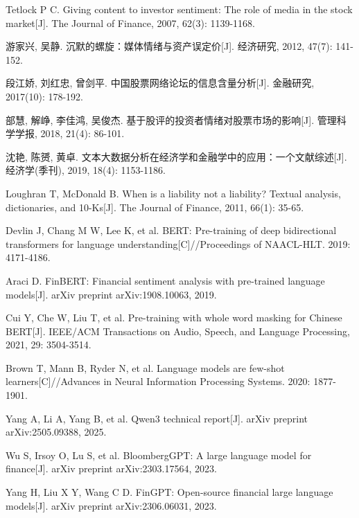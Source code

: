  Tetlock P C. Giving content to investor sentiment: The role of media in the stock market[J]. The Journal of Finance, 2007, 62(3): 1139-\allowbreak{}1168.

 游家兴, 吴静. 沉默的螺旋：媒体情绪与资产误定价[J]. 经济研究, 2012, 47(7): 141-\allowbreak{}152.

 段江娇, 刘红忠, 曾剑平. 中国股票网络论坛的信息含量分析[J]. 金融研究, 2017(10): 178-\allowbreak{}192.

 部慧, 解峥, 李佳鸿, 吴俊杰. 基于股评的投资者情绪对股票市场的影响[J]. 管理科学学报, 2018, 21(4): 86-\allowbreak{}101.

 沈艳, 陈赟, 黄卓. 文本大数据分析在经济学和金融学中的应用：一个文献综述[J]. 经济学(季刊), 2019, 18(4): 1153-\allowbreak{}1186.

 Loughran T, McDonald B. When is a liability not a liability? Textual analysis, dictionaries, and 10-\allowbreak{}Ks[J]. The Journal of Finance, 2011, 66(1): 35-\allowbreak{}65.

 Devlin J, Chang M W, Lee K, et al. BERT: Pre-\allowbreak{}training of deep bidirectional transformers for language understanding[C]/\allowbreak{}/\allowbreak{}Proceedings of NAACL-\allowbreak{}HLT. 2019: 4171-\allowbreak{}4186.

 Araci D. FinBERT: Financial sentiment analysis with pre-\allowbreak{}trained language models[J]. arXiv preprint arXiv:1908.10063, 2019.

 Cui Y, Che W, Liu T, et al. Pre-\allowbreak{}training with whole word masking for Chinese BERT[J]. IEEE/\allowbreak{}ACM Transactions on Audio, Speech, and Language Processing, 2021, 29: 3504-\allowbreak{}3514.

 Brown T, Mann B, Ryder N, et al. Language models are few-\allowbreak{}shot learners[C]/\allowbreak{}/\allowbreak{}Advances in Neural Information Processing Systems. 2020: 1877-\allowbreak{}1901.

 Yang A, Li A, Yang B, et al. Qwen3 technical report[J]. arXiv preprint arXiv:2505.09388, 2025.

 Wu S, Irsoy O, Lu S, et al. BloombergGPT: A large language model for finance[J]. arXiv preprint arXiv:2303.17564, 2023.

 Yang H, Liu X Y, Wang C D. FinGPT: Open-\allowbreak{}source financial large language models[J]. arXiv preprint arXiv:2306.06031, 2023.

